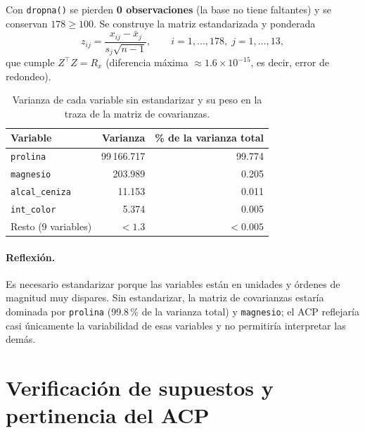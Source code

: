 \documentclass[11pt,a4paper]{article}
\newcommand{\var}[1]{\texttt{#1}}
\begin{document}
Con \texttt{dropna()} se pierden \textbf{0 observaciones} (la base no tiene faltantes) y se conservan $178 \geq 100$. Se construye la matriz estandarizada y ponderada
\[
  z_{ij} = \frac{x_{ij} - \bar{x}_j}{s_j\sqrt{n-1}}, \qquad i = 1,\dots,178,\; j = 1,\dots,13,
\]
que cumple $Z^\top Z = R_x$ (diferencia máxima $\approx 1.6\times 10^{-15}$, es decir, error de redondeo).

\begin{table}[H]
\centering\small
\caption{Varianza de cada variable sin estandarizar y su peso en la traza de la matriz de covarianzas.}
\begin{tabular}{lrr}
\toprule
Variable & Varianza & \% de la varianza total \\
\midrule
\var{prolina} & 99\,166.717 & 99.774 \\
\var{magnesio} & 203.989 & 0.205 \\
\var{alcal\_ceniza} & 11.153 & 0.011 \\
\var{int\_color} & 5.374 & 0.005 \\
Resto (9 variables) & $< 1.3$ & $< 0.005$ \\
\bottomrule
\end{tabular}
\end{table}

\paragraph{Reflexión.} Es necesario estandarizar porque las variables están en unidades y órdenes de magnitud muy dispares. Sin estandarizar, la matriz de covarianzas estaría dominada por \var{prolina} (99.8\,\% de la varianza total) y \var{magnesio}; el ACP reflejaría casi únicamente la variabilidad de esas variables y no permitiría interpretar las demás.

\section{Verificación de supuestos y pertinencia del ACP}
\end{document}
